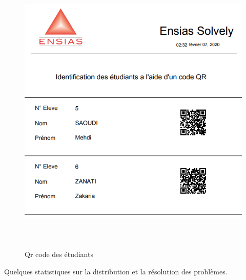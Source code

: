 \documentclass[11.5pt]{report}
\begin{document}
\begin{figure}[h]
	
	\begin{center}
		\includegraphics[width=500pt,height=400pt]{studentsqr.png} 
		\caption{Qr code des étudiants}
	\end{center}
	
\end{figure}
\newpage
Quelques statistiques sur la distribution et la résolution des problèmes.\\ 
\end{document}
